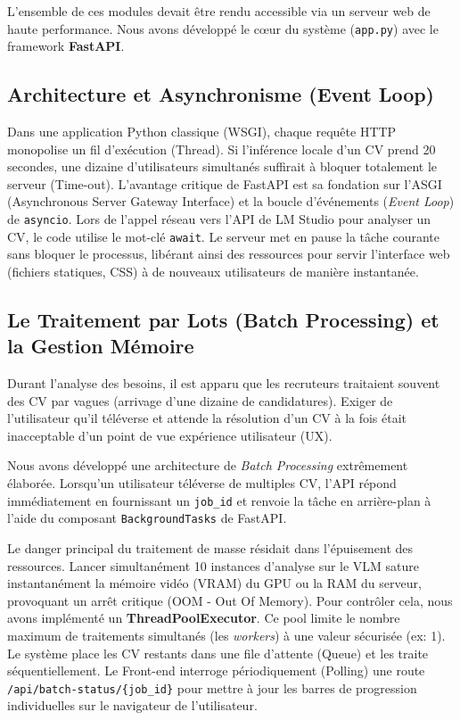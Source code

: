 L'ensemble de ces modules devait être rendu accessible via un serveur web de haute performance. Nous avons développé le cœur du système (\texttt{app.py}) avec le framework \textbf{FastAPI}.

\subsection{Architecture et Asynchronisme (Event Loop)}
Dans une application Python classique (WSGI), chaque requête HTTP monopolise un fil d'exécution (Thread). Si l'inférence locale d'un CV prend 20 secondes, une dizaine d'utilisateurs simultanés suffirait à bloquer totalement le serveur (Time-out). 
L'avantage critique de FastAPI est sa fondation sur l'ASGI (Asynchronous Server Gateway Interface) et la boucle d'événements (\textit{Event Loop}) de \texttt{asyncio}. Lors de l'appel réseau vers l'API de LM Studio pour analyser un CV, le code utilise le mot-clé \texttt{await}. Le serveur met en pause la tâche courante sans bloquer le processus, libérant ainsi des ressources pour servir l'interface web (fichiers statiques, CSS) à de nouveaux utilisateurs de manière instantanée.

\subsection{Le Traitement par Lots (Batch Processing) et la Gestion Mémoire}
Durant l'analyse des besoins, il est apparu que les recruteurs traitaient souvent des CV par vagues (arrivage d'une dizaine de candidatures). Exiger de l'utilisateur qu'il téléverse et attende la résolution d'un CV à la fois était inacceptable d'un point de vue expérience utilisateur (UX).

Nous avons développé une architecture de \textit{Batch Processing} extrêmement élaborée. Lorsqu'un utilisateur téléverse de multiples CV, l'API répond immédiatement en fournissant un \texttt{job\_id} et renvoie la tâche en arrière-plan à l'aide du composant \texttt{BackgroundTasks} de FastAPI.

Le danger principal du traitement de masse résidait dans l'épuisement des ressources. Lancer simultanément 10 instances d'analyse sur le VLM sature instantanément la mémoire vidéo (VRAM) du GPU ou la RAM du serveur, provoquant un arrêt critique (OOM - Out Of Memory). 
Pour contrôler cela, nous avons implémenté un \textbf{ThreadPoolExecutor}. Ce pool limite le nombre maximum de traitements simultanés (les \textit{workers}) à une valeur sécurisée (ex: 1). Le système place les CV restants dans une file d'attente (Queue) et les traite séquentiellement. Le Front-end interroge périodiquement (Polling) une route \texttt{/api/batch-status/\{job\_id\}} pour mettre à jour les barres de progression individuelles sur le navigateur de l'utilisateur.

